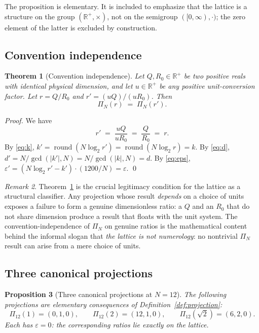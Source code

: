 \documentclass[11pt,a4paper]{article}
\newtheorem{theorem}{Theorem}[section]
\newtheorem{proposition}[theorem]{Proposition}
\theoremstyle{definition}
\theoremstyle{remark}
\newtheorem{remark}[theorem]{Remark}
\newcommand{\R}{\mathbb{R}}
\DeclareMathOperator{\round}{round}
\newcommand{\eps}{\varepsilon}
\begin{document}
The proposition is elementary. It is included to emphasize that the lattice is a structure on the group $(\R^{+},\times)$, not on the semigroup $([0,\infty),\cdot)$; the zero element of the latter is excluded by construction.

\subsection{Convention independence}

\begin{theorem}[Convention independence]\label{thm:conv}
Let $Q,R_{0}\in\R^{+}$ be two positive reals with identical physical dimension, and let $u\in\R^{+}$ be any positive unit-conversion factor. Let $r = Q/R_{0}$ and $r' = (uQ)/(uR_{0})$. Then
\[
\Pi_{N}(r) \;=\; \Pi_{N}(r').
\]
\end{theorem}

\begin{proof}
We have
\[
r' \;=\; \frac{uQ}{uR_{0}} \;=\; \frac{Q}{R_{0}} \;=\; r.
\]
By \eqref{eq:k}, $k' = \round(N\log_{2}r') = \round(N\log_{2}r) = k$. By \eqref{eq:d}, $d'=N/\gcd(|k'|,N) = N/\gcd(|k|,N) = d$. By \eqref{eq:eps}, $\eps' = (N\log_{2}r'-k')\cdot(1200/N) = \eps$. \qed
\end{proof}

\begin{remark}
Theorem~\ref{thm:conv} is the crucial legitimacy condition for the lattice as a structural classifier. Any projection whose result \emph{depends} on a choice of units exposes a failure to form a genuine dimensionless ratio: a $Q$ and an $R_{0}$ that do not share dimension produce a result that floats with the unit system. The convention-independence of $\Pi_{N}$ on genuine ratios is the mathematical content behind the informal slogan that \emph{the lattice is not numerology}: no nontrivial $\Pi_{N}$ result can arise from a mere choice of units.
\end{remark}

\subsection{Three canonical projections}

\begin{proposition}[Three canonical projections at $N=12$]\label{prop:canonical}
The following projections are elementary consequences of Definition~\ref{def:projection}:
\[
\Pi_{12}(1) = (0,1,0), \qquad \Pi_{12}(2) = (12,1,0), \qquad \Pi_{12}(\sqrt{2}) = (6,2,0).
\]
Each has $\eps=0$: the corresponding ratios lie exactly on the lattice.
\end{proposition}
\end{document}
